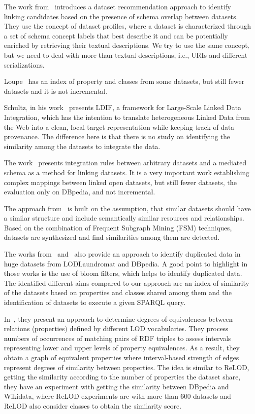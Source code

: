 \documentclass[sw]{iosart2x}
\begin{document}
The work from~\cite{ellefi2016dataset} introduces a dataset recommendation approach to identify linking candidates based on the presence of schema overlap between datasets.
They use the concept of dataset profiles, where a dataset is characterized through a set of schema concept labels that best describe it and can be potentially enriched by retrieving their textual descriptions.
We try to use the same concept, but we need to deal with more than textual descriptions, i.e., URIs and different serializations.

Loupe~\cite{mihindukulasooriya2016two} has an index of property and classes from some datasets, but still fewer datasets and it is not incremental.

Schultz, in his work~\cite{www12schultz} presents LDIF, a framework for Large-Scale Linked Data Integration, which has the intention to translate heterogeneous Linked Data from the Web into a clean, local target representation while keeping track of data provenance.
The difference here is that there is no study on identifying the similarity among the datasets to integrate the data.

The work~\cite{rouces2016complex} presents integration rules between arbitrary datasets and a mediated schema as a method for linking datasets.
It is a very important work establishing complex mappings between linked open datasets, but still fewer datasets, the evaluation only on DBpedia, and not incremental.

The approach from~\cite{emaldi2015detection} is built on the assumption, that similar datasets should have a similar structure and include semantically similar resources and relationships.
Based on the combination of Frequent Subgraph Mining (FSM) techniques, datasets are synthesized and find similarities among them are detected.

The works from~\cite{baron-2016-ldow-assessing-links} and~\cite{BaronKKPEH2017IDOL} also provide an approach to identify duplicated data in huge datasets from LODLaundromat and DBpedia.
A good point to highlight in those works is the use of bloom filters, which helps to identify duplicated data.
The identified different aims compared to our approach are an index of similarity of the datasets based on properties and classes shared among them and the identification of datasets to execute a given SPARQL query.

In~\cite{to2017linked}, they present an approach to determine degrees of equivalences between relations (properties) defined by different LOD vocabularies.
They process numbers of occurrences of matching pairs of RDF triples to assess intervals representing lower and upper levels of property equivalences.
As a result, they obtain a graph of equivalent properties where interval-based strength of edges represent degrees of similarity between properties.
The idea is similar to ReLOD, getting the similarity according to the number of properties the dataset share, they have an experiment with getting the similarity between DBpedia and Wikidata, where ReLOD experiments are with more than 600 datasets and ReLOD also consider classes to obtain the similarity score.
\end{document}
